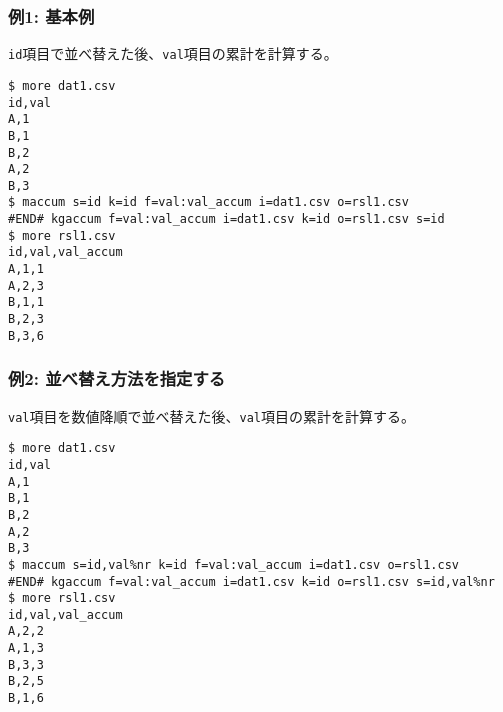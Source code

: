 \subsubsection*{例1: 基本例}

\verb|id|項目で並べ替えた後、\verb|val|項目の累計を計算する。


\begin{Verbatim}[baselinestretch=0.7,frame=single]
$ more dat1.csv
id,val
A,1
B,1
B,2
A,2
B,3
$ maccum s=id k=id f=val:val_accum i=dat1.csv o=rsl1.csv
#END# kgaccum f=val:val_accum i=dat1.csv k=id o=rsl1.csv s=id
$ more rsl1.csv
id,val,val_accum
A,1,1
A,2,3
B,1,1
B,2,3
B,3,6
\end{Verbatim}
\subsubsection*{例2: 並べ替え方法を指定する}

\verb|val|項目を数値降順で並べ替えた後、\verb|val|項目の累計を計算する。


\begin{Verbatim}[baselinestretch=0.7,frame=single]
$ more dat1.csv
id,val
A,1
B,1
B,2
A,2
B,3
$ maccum s=id,val%nr k=id f=val:val_accum i=dat1.csv o=rsl1.csv
#END# kgaccum f=val:val_accum i=dat1.csv k=id o=rsl1.csv s=id,val%nr
$ more rsl1.csv
id,val,val_accum
A,2,2
A,1,3
B,3,3
B,2,5
B,1,6
\end{Verbatim}
